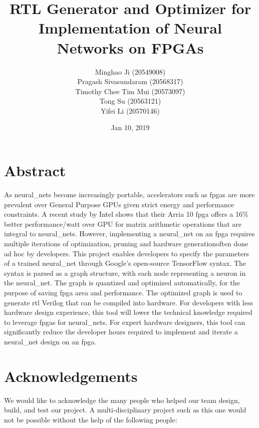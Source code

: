 \documentclass{uw-ece-wkrpt}
\title{RTL Generator and Optimizer for Implementation of Neural Networks on FPGAs}
\author{Minghao Ji (20549008)\\
        Pragash Sivasundaram (20568317)\\
        Timothy Chee Tim Mui (20573097)\\
        Tong Su (20563121)\\
        Yifei Li (20570146)}
\date{Jan 10, 2019}
\begin{document}
\maketitle

\frontmatter

\begin{onehalfspacing}

\section{Abstract}
As \glspl{neural_net} become increasingly portable, accelerators such as \glspl{fpga} are more prevalent over General Purpose GPUs given strict energy and performance constraints. A recent study by Intel shows that their Arria 10 \gls{fpga} offers a 16\% better performance/watt over GPU for matrix arithmetic operations that are integral to \glspl{neural_net}. However, implementing a \gls{neural_net} on an \gls{fpga} requires multiple iterations of optimization, pruning and hardware generation\textemdash{}often done ad hoc by developers. This project enables developers to specify the parameters of a trained \gls{neural_net} through Google's open-source TensorFlow syntax. The syntax is parsed as a graph structure, with each node representing a neuron in the \gls{neural_net}. The graph is quantized and optimized automatically, for the purpose of saving \gls{fpga} area and performance. The optimized graph is used to generate \gls{rtl} Verilog that can be compiled into hardware. For developers with less hardware design experience, this tool will lower the technical knowledge required to leverage \glspl{fpga} for \glspl{neural_net}. For expert hardware designers, this tool can significantly reduce the developer hours required to implement and iterate a \gls{neural_net} design on an \gls{fpga}.

\clearpage
\section{Acknowledgements}
We would like to acknowledge the many people who helped our team design, build, and test our project. A multi-disciplinary project such as this one would not be possible without the help of the following people:


\end{onehalfspacing}
\end{document}
